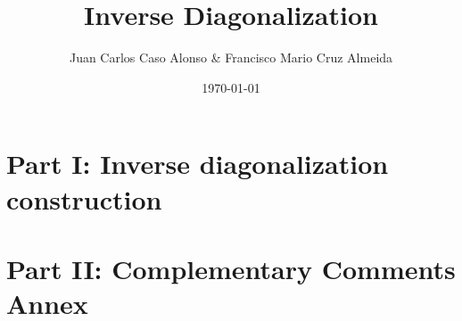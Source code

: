\documentclass[notitlepage]{report}
\title{Inverse Diagonalization}
\author{Juan Carlos Caso Alonso \& Francisco Mario Cruz Almeida}
\date{\today}
\begin{document}
	
	\maketitle
	\thispagestyle{empty}
	
	
		
	
	\tableofcontents
	
	\part{Part I: Inverse diagonalization construction}

	
	
	
	
	\part{Part II: Complementary Comments Annex}
	
	
\end{document}
